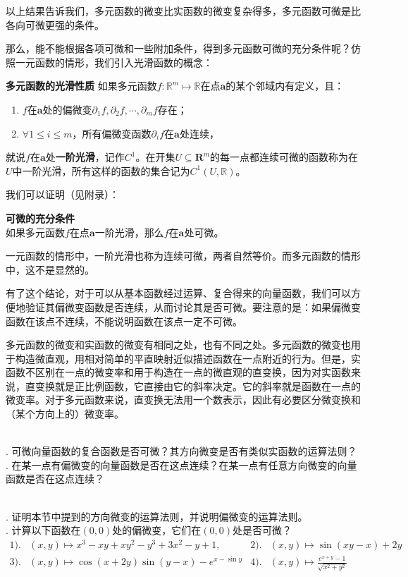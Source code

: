 \documentclass[12pt,UTF8,fontset=none]{ctexbook}
\begin{document}
以上结果告诉我们，多元函数的微变比实函数的微变复杂得多，多元函数可微是比各向可微更强的条件。

那么，能不能根据各项可微和一些附加条件，得到多元函数可微的充分条件呢？仿照一元函数的情形，我们引入光滑函数的概念：
\begin{df}{\textbf{多元函数的光滑性质}}
    如果多元函数$f: \mathbb{R}^m \mapsto \mathbb{R}$在点$\mathbf{a}$的某个邻域内有定义，且：
    \begin{enumerate}[label=\arabic*.]
    \item $f$在$\mathbf{a}$处的偏微变$\partial_1 f, \partial_2 f, \cdots, \partial_m f$存在；
    \item $\forall 1\leqslant i \leqslant m$，所有偏微变函数$\partial_i f$在$\mathbf{a}$处连续，
    \end{enumerate}
    就说$f$在$\mathbf{a}$处\textbf{一阶光滑}，记作$C^1$。在开集$U\subseteq\mathbf{R}^m$的每一点都连续可微的函数称为在$U$中一阶光滑，所有这样的函数的集合记为$C^1(U, \mathbb{R})$。
\end{df}
我们可以证明（见附录）：
\begin{tm}{\textbf{可微的充分条件}}\\
如果多元函数$f$在点$\mathbf{a}$一阶光滑，那么$f$在$\mathbf{a}$处可微。
\end{tm}
一元函数的情形中，一阶光滑也称为连续可微，两者自然等价。而多元函数的情形中，这不是显然的。

有了这个结论，对于可以从基本函数经过运算、复合得来的向量函数，我们可以方便地验证其偏微变函数是否连续，从而讨论其是否可微。要注意的是：如果偏微变函数在该点不连续，不能说明函数在该点一定不可微。

多元函数的微变和实函数的微变有相同之处，也有不同之处。多元函数的微变也用于构造微直观，用相对简单的平直映射近似描述函数在一点附近的行为。但是，实函数不区别在一点的微变率和用于构造在一点的微直观的直变换，因为对实函数来说，直变换就是正比例函数，它直接由它的斜率决定。它的斜率就是函数在一点的微变率。对于多元函数来说，直变换无法用一个数表示，因此有必要区分微变换和（某个方向上的）微变率。

\begin{sk}
    \mbox{} \\
    . 可微向量函数的复合函数是否可微？其方向微变是否有类似实函数的运算法则？\\
    . 在某一点有偏微变的向量函数是否在这点连续？在某一点有任意方向微变的向量函数是否在这点连续？
\end{sk}

\begin{xt}
    \mbox{} \\
    . 证明本节中提到的方向微变的运算法则，并说明偏微变的运算法则。\\
    . 
    计算以下函数在$(0,0)$处的偏微变，它们在$(0,0)$处是否可微？
    \begin{align*}
        1).& (x,y) \mapsto x^3 - xy + xy^2 - y^3 + 3x^2 - y + 1,  &2).& (x,y) \mapsto \sin{(xy - x)} + 2y \\
        3).& (x,y) \mapsto \cos{(x + 2y)}\sin{(y - x)}  - e^{x - \sin{y}}   & 4).& (x,y) \mapsto \displaystyle\frac{e^{x + y} - 1}{\sqrt{x^2 + y^2}}
    \end{align*}
\end{xt}
\end{document}

